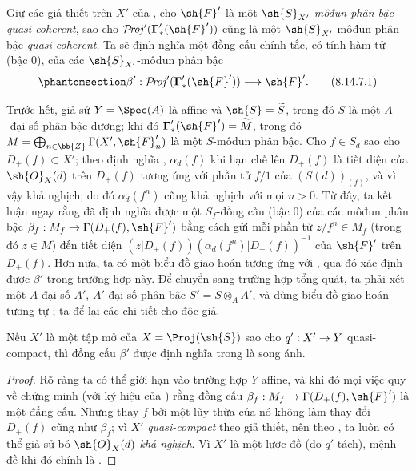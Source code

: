 \documentclass[oneside,10pt]{amsart}
\makeatletter
\newcommand{\ega@arrow}[2]{\mathchoice{#1}{#2}{#2}{#2}}
\renewcommand{\to}{\ega@arrow{\longrightarrow}{\rightarrow}}
\def\shProj{\mathcal{P}\!\mathit{roj}}
\newcommand{\oldpage}[2][]{\marginnote{\normalfont\footnotesize\textbf{#1}~|~#2}\ignorespaces}
\let\EGAOriginalLabel\label
\renewcommand{\label}[1]{\phantomsection\EGAOriginalLabel{#1}}
\makeatother
\begin{document}
\begin{env}[8.14.7]
\label{II.8.14.7}
Giữ các giả thiết trên $X'$ của , cho $\sh{F}'$ là một \emph{$\sh{S}_{X'}$-môđun phân bậc quasi-coherent}, sao cho $\shProj'(\boldsymbol{\Gamma}'_*(\sh{F}'))$ cũng là một $\sh{S}_{X'}$-môđun phân bậc \emph{quasi-coherent}.
\oldpage[II]{200}
Ta sẽ định nghĩa một đồng cấu chính tắc, có tính hàm tử (bậc $0$), của các $\sh{S}_{X'}$-môđun phân bậc
\[
\label{II.8.14.7.1}
    \beta': \shProj'(\boldsymbol{\Gamma}'_*(\sh{F}')) \to \sh{F}'.
\tag{8.14.7.1}
\]

Trước hết, giả sử $Y=\Spec(A)$ là affine và $\sh{S}=\widetilde{S}$, trong đó $S$ là một $A$-đại số phân bậc dương;
khi đó $\boldsymbol{\Gamma}'_*(\sh{F}')=\widetilde{M}$, trong đó $M=\bigoplus_{n\in\bb{Z}}\Gamma(X',\sh{F}'_n)$ là một $S$-môđun phân bậc.
Cho $f\in S_d$ sao cho $D_+(f)\subset X'$;
theo định nghĩa , $\alpha_d(f)$ khi hạn chế lên $D_+(f)$ là tiết diện của $\sh{O}_X(d)$ trên $D_+(f)$ tương ứng với phần tử $f/1$ của $(S(d))_{(f)}$, và vì vậy khả nghịch;
do đó $\alpha_d(f^n)$ cũng khả nghịch với mọi $n>0$.
Từ đây, ta kết luận ngay rằng đã định nghĩa được một $S_f$-đồng cấu (bậc $0$) của các môđun phân bậc $\beta_f:M_f\to\Gamma(D_+(f),\sh{F}')$ bằng cách gửi mỗi phần tử $z/f^n\in M_f$ (trong đó $z\in M$) đến tiết diện $(z|D_+(f))(\alpha_d(f^n)|D_+(f))^{-1}$ của $\sh{F}'$ trên $D_+(f)$.
Hơn nữa, ta có một biểu đồ giao hoán tương ứng với , qua đó xác định được $\beta'$ trong trường hợp này.
Để chuyển sang trường hợp tổng quát, ta phải xét một $A$-đại số $A'$, $A'$-đại số phân bậc $S'=S\otimes_A A'$, và dùng biểu đồ giao hoán tương tự ;
ta để lại các chi tiết cho độc giả.
\end{env}

\begin{proposition}[8.14.8]
\label{II.8.14.8}
Nếu $X'$ là một tập mở của $X=\Proj(\sh{S})$ sao cho $q':X'\to Y$ quasi-compact, thì đồng cấu $\beta'$ được định nghĩa trong  là song ánh.
\end{proposition}

\begin{proof}
Rõ ràng ta có thể giới hạn vào trường hợp $Y$ affine, và khi đó mọi việc quy về chứng minh (với ký hiệu của ) rằng đồng cấu $\beta_f:M_f\to\Gamma(D_+(f),\sh{F}')$ là một đẳng cấu.
Nhưng thay $f$ bởi một lũy thừa của nó không làm thay đổi $D_+(f)$ cũng như $\beta_f$;
vì $X'$ \emph{quasi-compact} theo giả thiết, nên theo , ta luôn có thể giả sử bó $\sh{O}_X(d)$ \emph{khả nghịch}.
Vì $X'$ là một lược đồ (do $q'$ tách), mệnh đề khi đó chính là .
\end{proof}
\end{document}
